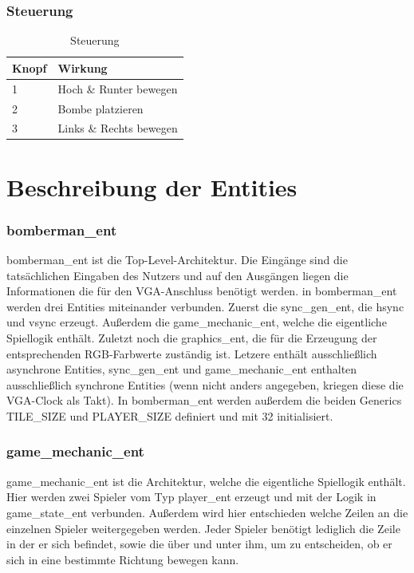 \documentclass[parskip=full]{scrartcl}
\begin{document}
		
		\section{Steuerung}
			\begin{table}[H]
				\centering
				\label{controls}
				\begin{tabular}{|l|l|}
					\hline
					\textbf{Knopf} & \textbf{Wirkung}      \\ \hline
					1           & Hoch \& Runter bewegen               \\ \hline
					2           & Bombe platzieren                 \\ \hline
					3           & Links \& Rechts bewegen                    \\ \hline
				\end{tabular}
				\caption{Steuerung}
			\end{table}
			
	
	\part{Beschreibung der Entities}
		\section{bomberman\_ent}
			bomberman\_ent ist die Top-Level-Architektur. Die Eingänge sind die tatsächlichen Eingaben des Nutzers und auf den Ausgängen liegen die Informationen die für den VGA-Anschluss benötigt werden. in bomberman\_ent werden drei Entities miteinander verbunden. Zuerst die sync\_gen\_ent, die hsync und vsync erzeugt. Außerdem die game\_mechanic\_ent, welche die eigentliche Spiellogik enthält. Zuletzt noch die graphics\_ent, die für die Erzeugung der entsprechenden RGB-Farbwerte zuständig ist. 
			Letzere enthält ausschließlich asynchrone Entities, sync\_gen\_ent und game\_mechanic\_ent enthalten ausschließlich synchrone Entities (wenn nicht anders angegeben, kriegen diese die VGA-Clock als Takt).
			In bomberman\_ent werden außerdem die beiden Generics TILE\_SIZE und PLAYER\_SIZE definiert und mit 32 initialisiert.
		
		\section{game\_mechanic\_ent}
			game\_mechanic\_ent ist die Architektur, welche die eigentliche Spiellogik enthält. Hier werden zwei Spieler vom Typ player\_ent erzeugt und mit der Logik in game\_state\_ent verbunden. Außerdem wird hier entschieden welche Zeilen an die einzelnen Spieler weitergegeben werden. Jeder Spieler benötigt lediglich die Zeile in der er sich befindet, sowie die über und unter ihm, um zu entscheiden, ob er sich in eine bestimmte Richtung bewegen kann. 
		
\end{document}
